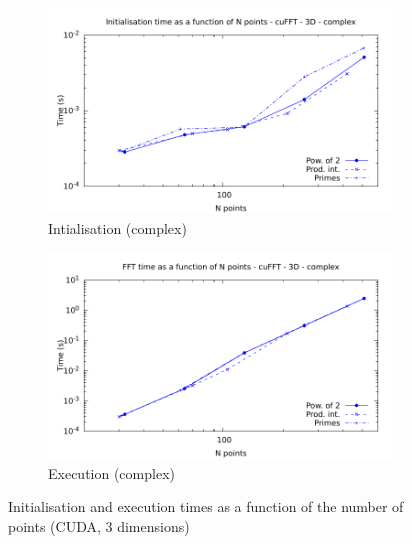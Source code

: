 \documentclass[12pt, a4paper]{article}
\begin{document}
\begin{figure}[H]
\begin{subfigure}{.5\textwidth}
\centering
\includegraphics[width=.9\linewidth]{graphs/fft-cuda-3d-pow2-c-init.pdf}
\caption{Intialisation (complex)}
\label{FFTCUDA3DCI}
\end{subfigure}%
\begin{subfigure}{.5\textwidth}
\centering
\includegraphics[width=.9\linewidth]{graphs/fft-cuda-3d-pow2-c-exec.pdf}
\caption{Execution (complex)}
\label{FFTCUDA3DCE}
\end{subfigure}
\caption{Initialisation and execution times as a function of the number of points (CUDA, 3 dimensions)}
\label{FFTCUDA3D}
\end{figure}
\end{document}
